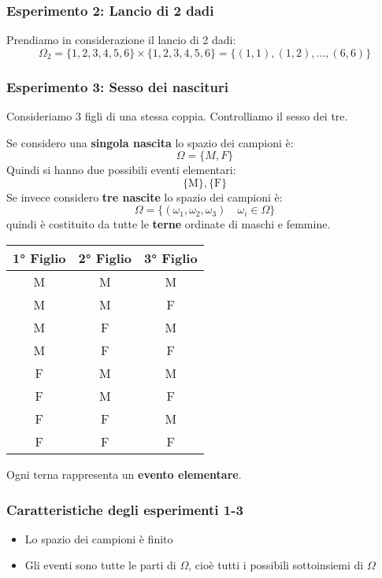 \documentclass[a4paper]{article}
\theoremstyle{break}
\theoremstyle{break}
\theoremstyle{break}
\theoremstyle{break}
\begin{document}
\subsubsection{Esperimento 2: Lancio di 2 dadi}
Prendiamo in considerazione il lancio di 2 dadi:
\[
  \Omega_2 = \{1, 2, 3, 4, 5, 6\} \times \{1, 2, 3, 4, 5, 6\} = \{(1,1), (1,2), \ldots, (6,6)\}
\] 

\subsubsection{Esperimento 3: Sesso dei nascituri}
Consideriamo 3 figli di una stessa coppia. Controlliamo il sesso dei tre.

Se considero una \textbf{singola nascita} lo spazio dei campioni è:
\[
\Omega = \{M, F\}
\] 
Quindi si hanno due possibili eventi elementari:
\[
\{\text{M}\}, \{\text{F}\}
\]
Se invece considero \textbf{tre nascite} lo spazio dei campioni è:
\[
\Omega = \{(\omega_1, \omega_2, \omega_3) \quad \omega_i \in \Omega\}
\]
quindi è costituito da tutte le \textbf{terne} ordinate di maschi e femmine.
\begin{table}[H]
  \centering
  \begin{tabular}{|c|c|c|}
    \hline
    1° Figlio & 2° Figlio & 3° Figlio \\
    \hline
    M         & M         & M         \\
    M         & M         & F         \\
    M         & F         & M         \\
    M         & F         & F         \\
    F         & M         & M         \\
    F         & M         & F         \\
    F         & F         & M         \\
    F         & F         & F         \\
    \hline
  \end{tabular}
\end{table}
\noindent Ogni terna rappresenta un \textbf{evento elementare}.

\subsubsection{Caratteristiche degli esperimenti 1-3}
\begin{itemize}
  \item Lo spazio dei campioni è finito
  \item Gli eventi sono tutte le parti di \( \Omega \), cioè tutti i possibili sottoinsiemi
    di \( \Omega \)
\end{itemize}
\end{document}
